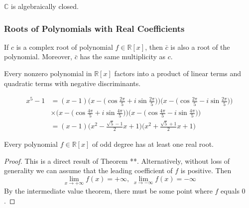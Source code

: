 \documentclass{article}
\begin{document}
      \begin{corollary}
        $\mathbb{C}$ is algebraically closed. 
      \end{corollary}

    \subsubsection{Roots of Polynomials with Real Coefficients}

      \begin{theorem}
        If $c$ is a complex root of polynomial $f \in \mathbb{R}[x]$, then $\bar{c}$ is also a root of the polynomial. Moreover, $\bar{c}$ has the same multiplicity as $c$. 
      \end{theorem}

      \begin{corollary}
        Every nonzero polynomial in $\mathbb{R}[x]$ factors into a product of linear terms and quadratic terms with negative discriminants. 
      \end{corollary}

      \begin{example}
      \begin{align*}
        x^5 - 1 & = (x-1) \bigg( x - \Big( \cos{\frac{2\pi}{5}} + i \sin{\frac{2\pi}{5}}\Big) \bigg) \bigg( x - \Big( \cos{\frac{2\pi}{5}} - i \sin{\frac{2\pi}{5}}\Big) \bigg) \\
        & \times \bigg( x - \Big( \cos{\frac{4\pi}{5}} + i \sin{\frac{4\pi}{5}}\Big) \bigg) \bigg( x - \Big( \cos{\frac{4\pi}{5}} - i \sin{\frac{4\pi}{5}}\Big) \bigg) \\
        & = (x-1) \bigg( x^2 - \frac{\sqrt{5} - 1}{2} x + 1\bigg) \bigg( x^2 + \frac{\sqrt{5} + 1}{2} x + 1\bigg) 
      \end{align*}
      \end{example}

      \begin{corollary}
        Every polynomial $f \in \mathbb{R}[x]$ of odd degree has at least one real root. 
      \end{corollary}
      \begin{proof}
        This is a direct result of Theorem **. Alternatively, without loss of generality we can assume that the leading coefficient of $f$ is positive. Then
        \[ \lim_{x \rightarrow + \infty} f(x) = + \infty, \; \lim_{x \rightarrow -\infty} f(x) = -\infty\]
        By the intermediate value theorem, there must be some point where $f$ equals $0$. 
      \end{proof}
\end{document}

